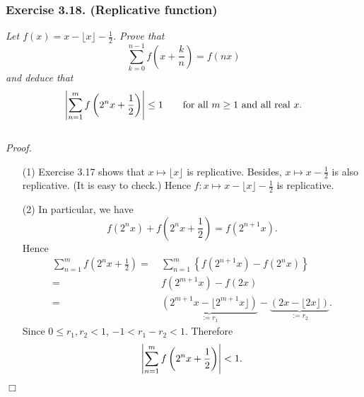 \documentclass{article}
\begin{document}
\subsubsection*{Exercise 3.18. (Replicative function)}
\emph{Let $f(x) = x - \lfloor x \rfloor - \frac{1}{2}$.
Prove that
\[
  \sum_{k=0}^{n-1} f\left( x+\frac{k}{n} \right) = f(nx)
\]
and deduce that}
\[
  \abs{ \sum_{n=1}^{m} f\left( 2^n x + \frac{1}{2} \right) } \leq 1
  \qquad
  \text{for all $m \geq 1$ and all real $x$}.
\] \\



\emph{Proof.}
\begin{enumerate}
\item[(1)]
  Exercise 3.17 shows that $x \mapsto \lfloor x \rfloor$ is replicative.
  Besides, $x \mapsto x - \frac{1}{2}$ is also replicative. (It is easy to check.)
  Hence $f: x \mapsto x - \lfloor x \rfloor - \frac{1}{2}$ is replicative.

\item[(2)]
  In particular, we have
  \[
    f\left( 2^n x \right) + f\left( 2^n x + \frac{1}{2} \right)
    = f\left( 2^{n+1} x \right).
  \]
  Hence
  \begin{align*}
    \sum_{n=1}^{m} f\left( 2^n x + \frac{1}{2} \right)
    =& \:
    \sum_{n=1}^{m} \left\{f(2^{n+1} x) - f(2^n x) \right\} \\
    =& \:
    f(2^{m+1} x) - f(2x) \\
    =& \:
    \underbrace{(2^{m+1}x - \lfloor 2^{m+1}x \rfloor)}_{:= r_1}
        - \underbrace{(2x - \lfloor 2x \rfloor)}_{:= r_2}.
  \end{align*}
  Since $0 \leq r_1, r_2 < 1$, $-1 < r_1 - r_2 < 1$.
  Therefore
  \[
    \abs{ \sum_{n=1}^{m} f\left( 2^n x + \frac{1}{2} \right) } < 1.
  \]
\end{enumerate}
$\Box$ \\
\end{document}
